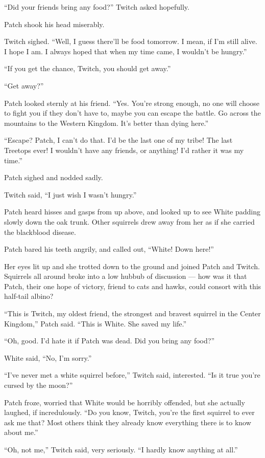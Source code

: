 \documentclass[ebook,oneside,openany,17pt]{memoir}
\begin{document}
“Did your friends bring any food?” Twitch asked hopefully.

Patch shook his head miserably.

Twitch sighed. “Well, I guess there’ll be food tomorrow. I mean, if
I’m still alive. I hope I am. I always hoped that when my time came, I
wouldn’t be hungry.”

“If you get the chance, Twitch, you should get away.”

“Get away?”

Patch looked sternly at his friend. “Yes. You’re strong enough, no one
will choose to fight you if they don’t have to, maybe you can escape
the battle. Go across the mountains to the Western Kingdom. It’s
better than dying here.”

“Escape? Patch, I can’t do that. I’d be the last one of my tribe! The
last Treetops ever! I wouldn’t have any friends, or anything! I’d
rather it was my time.”

Patch sighed and nodded sadly.

Twitch said, “I just wish I wasn’t hungry.”

Patch heard hisses and gasps from up above, and looked up to see White
padding slowly down the oak trunk. Other squirrels drew away from her
as if she carried the blackblood disease.

Patch bared his teeth angrily, and called out, “White! Down here!”

Her eyes lit up and she trotted down to the ground and joined Patch
and Twitch. Squirrels all around broke into a low hubbub of discussion
— how was it that Patch, their one hope of victory, friend to cats and
hawks, could consort with this half-tail albino?

“This is Twitch, my oldest friend, the strongest and bravest squirrel
in the Center Kingdom,” Patch said. “This is White. She saved my
life.”

“Oh, good. I’d hate it if Patch was dead. Did you bring any food?”

White said, “No, I’m sorry.”

“I’ve never met a white squirrel before,” Twitch said, interested. “Is
it true you’re cursed by the moon?”

Patch froze, worried that White would be horribly offended, but she
actually laughed, if incredulously. “Do you know, Twitch, you’re the
first squirrel to ever ask me that? Most others think they already
know everything there is to know about me.”

“Oh, not me,” Twitch said, very seriously. “I hardly know anything at
all.”
\end{document}
